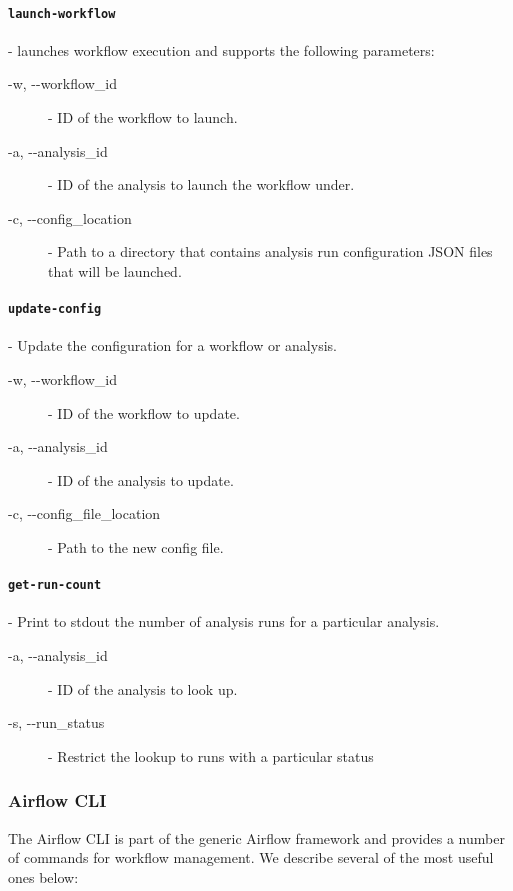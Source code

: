\paragraph{\texttt{launch-workflow}} - launches workflow execution and supports the following parameters:

\begin{description}
\item [-w, -\--workflow\_id] - ID of the workflow to launch.
\item [-a, -\--analysis\_id] - ID of the analysis to launch the workflow under.
\item [-c, -\--config\_location] - Path to a directory that contains analysis run configuration JSON files that will be launched. 
\end{description}

\paragraph{\texttt{update-config}} - Update the configuration for a workflow or analysis.

\begin{description}
\item [-w, -\--workflow\_id] - ID of the workflow to update.
\item [-a, -\--analysis\_id] - ID of the analysis to update.
\item [-c, -\--config\_file\_location] - Path to the new config file.
\end{description}

\paragraph{\texttt{get-run-count}} - Print to stdout the number of analysis runs for a particular analysis.

\begin{description}
\item [-a, -\--analysis\_id] - ID of the analysis to look up.
\item [-s, -\--run\_status] - Restrict the lookup to runs with a particular status
\end{description}

\subsubsection{Airflow CLI}

The Airflow CLI is part of the generic Airflow framework and provides a number of commands for workflow management. We describe several of the most useful ones below:

